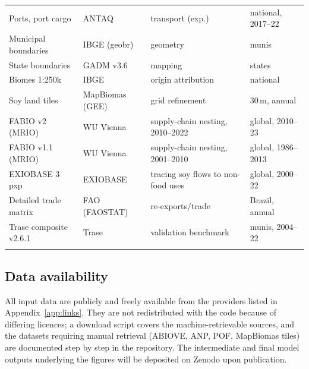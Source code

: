 \documentclass[pdflatex,sn-nature]{sn-jnl}%
\begin{document}
\begin{table}[htbp]
\begin{tabular}{@{}p{3.5cm}p{2.3cm}p{3.0cm}p{2.6cm}@{}}
Ports, port cargo                  & ANTAQ               & transport (exp.)      & national, 2017--22 \\
Municipal boundaries               & IBGE (geobr)        & geometry              & munis \\
State boundaries                   & GADM v3.6           & mapping               & states \\
Biomes 1:250k                      & IBGE                & origin attribution    & national \\
Soy land tiles                     & MapBiomas (GEE)     & grid refinement       & 30\,m, annual \\
FABIO v2 (MRIO)                    & WU Vienna           & supply-chain nesting, 2010--2022 & global, 2010--23 \\
FABIO v1.1 (MRIO)                  & WU Vienna           & supply-chain nesting, 2001--2010 & global, 1986--2013 \\
EXIOBASE 3 pxp                     & EXIOBASE            & tracing soy flows to non-food uses    & global, 2000--22 \\
Detailed trade matrix              & FAO (FAOSTAT)       & re-exports/trade      & Brazil, annual \\
Trase composite v2.6.1             & Trase               & validation benchmark  & munis, 2004--22 \\
\botrule
\end{tabular}
\end{table}

\subsection{Data availability}\label{subsec:data-availability}
All input data are publicly and freely available from the providers listed
in Appendix~\ref{app:links}. They are not redistributed with the code
because of differing licences; a download script covers the
machine-retrievable sources, and the datasets requiring manual retrieval
(ABIOVE, ANP, POF, MapBiomas tiles) are documented step by step in the
repository. The intermediate and final model outputs underlying the figures
will be deposited on Zenodo upon publication.

\end{document}
